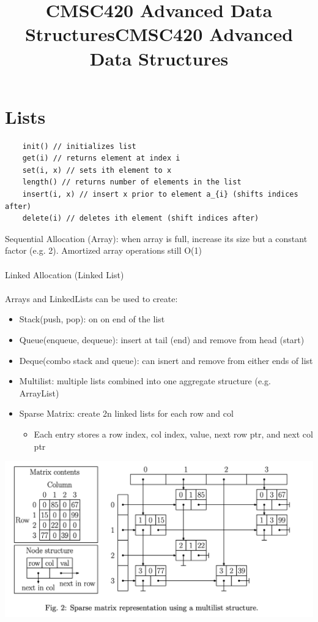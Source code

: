 \documentclass{article}
\title{CMSC420 Advanced Data Structures}
\date{}
\begin{document}
 
  \title{CMSC420 Advanced Data Structures}
  \maketitle
  \tableofcontents
  \newpage
  \noindent \section{Lists}
  \begin{lstlisting}
    init() // initializes list
    get(i) // returns element at index i
    set(i, x) // sets ith element to x
    length() // returns number of elements in the list
    insert(i, x) // insert x prior to element a_{i} (shifts indices after)
    delete(i) // deletes ith element (shift indices after)
  \end{lstlisting}
  Sequential Allocation (Array): when array is full, increase  its size but a constant factor (e.g. 2). Amortized array operations still O(1) \\ \\
  Linked Allocation (Linked List) \\ \\
  Arrays and LinkedLists can be used to create:
  \begin{itemize}[noitemsep]
  \item Stack(push, pop): on on end of the list
  \item Queue(enqueue, dequeue): insert at tail (end) and remove from head (start)
  \item Deque(combo stack and queue): can isnert and remove from either ends of list
  \item Multilist: multiple lists combined into one aggregate structure (e.g. ArrayList)
  \item Sparse Matrix: create 2n linked lists for each row and col
    \begin{itemize}[noitemsep]
      \item Each entry stores a row index, col index, value, next row ptr, and next col ptr
    \end{itemize}
  \end{itemize}
  \begin{center}
    \includegraphics[scale=0.3]{Fig_2}
  \end{center}
\end{document}
